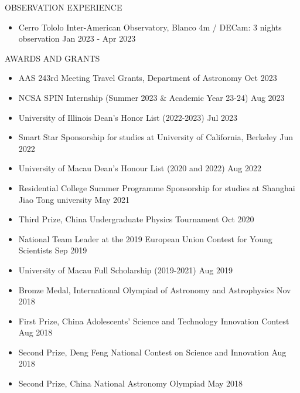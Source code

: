 \documentclass[10pt]{article} %
\begin{document}

\begin{section}{OBSERVATION EXPERIENCE}
    
\begin{itemize}[leftmargin=1.5em]
    \item Cerro Tololo Inter-American Observatory, Blanco 4m / DECam: 3 nights observation \hfill Jan 2023 - Apr 2023
\end{itemize}

\end{section}

\begin{section}{AWARDS AND GRANTS}

\begin{itemize}[leftmargin=1.5em]
    \item AAS 243rd Meeting Travel Grants, Department of Astronomy \hfill Oct 2023
    \item NCSA SPIN Internship (Summer 2023 \& Academic Year 23-24) \hfill Aug 2023 
    \item University of Illinois Dean's Honor List (2022-2023) \hfill Jul 2023
    \item Smart Star Sponsorship for studies at University of California, Berkeley \hfill Jun 2022
    \item University of Macau Dean's Honour List (2020 and 2022) \hfill Aug 2022
    \item Residential College Summer Programme Sponsorship for studies at Shanghai Jiao Tong university \hfill May 2021
    \item Third Prize, China Undergraduate Physics Tournament \hfill Oct 2020
    \item National Team Leader at the 2019 European Union Contest for Young Scientists \hfill Sep 2019
    \item University of Macau Full Scholarship (2019-2021) \hfill Aug 2019
    \item Bronze Medal, International Olympiad of Astronomy and Astrophysics \hfill Nov 2018
    \item First Prize, China Adolescents' Science and Technology Innovation Contest \hfill Aug 2018
    \item Second Prize, Deng Feng National Contest on Science and Innovation \hfill Aug 2018
    \item Second Prize, China National Astronomy Olympiad \hfill May 2018
\end{itemize}
    
\end{section}
\end{document}
